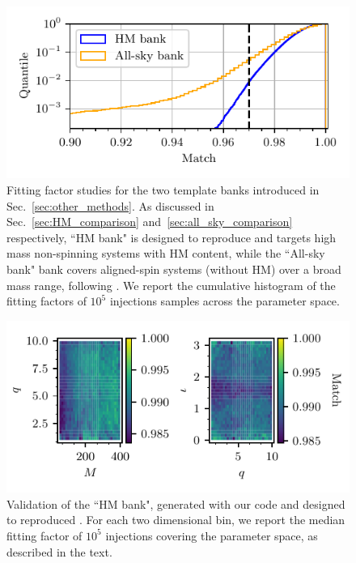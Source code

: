 \documentclass[twocolumn,showpacs,preprintnumbers,nofootinbib,prd,
superscriptaddress,10pt]{revtex4-2}
\begin{document}
\begin{figure}[t]
	\centering
	\includegraphics[scale = 1.]{test_banks_hist}
	\caption{Fitting factor studies for the two template banks introduced in Sec.~\ref{sec:other_methods}. As discussed in Sec.~\ref{sec:HM_comparison} and~\ref{sec:all_sky_comparison} respectively, ``HM bank" is designed to reproduce \cite{Harry:2017weg} and targets high mass non-spinning systems with HM content, while the ``All-sky bank" bank covers aligned-spin systems (without HM) over a broad mass range, following \cite{Sakon:2022ibh}. We report the cumulative histogram of the fitting factors of $10^5$ injections samples across the parameter space.}
	\label{fig:test_banks_hist}
\end{figure}

\begin{figure}
	\includegraphics[scale = 1.]{symphony_HM_injections}
	\caption{Validation of the ``HM bank", generated with our code and designed to reproduced \cite{Harry:2017weg}. For each two dimensional bin, we report the median fitting factor of $10^5$ injections covering the parameter space, as described in the text.}
	\label{fig:symphony_HM_injections}
\end{figure}
\end{document}
